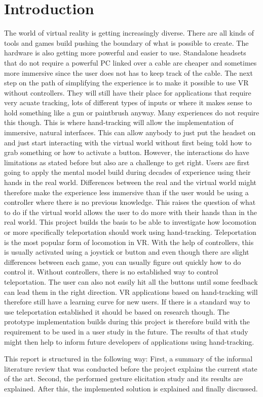
\chapter{Introduction}
The world of virtual reality is getting increasingly diverse. There are all kinds of tools and games build pushing the boundary of what is possible to create. The hardware is also getting more powerful and easier to use. Standalone headsets that do not require a powerful PC linked over a cable are cheaper and sometimes more immersive since the user does not has to keep track of the cable. The next step on the path of simplifying the experience is to make it possible to use VR without controllers. They will still have their place for applications that require very acuate tracking, lots of different types of inputs or where it makes sense to hold something like a gun or paintbrush anyway. Many experiences do not require this though. This is where hand-tracking will allow the implementation of immersive, natural interfaces. This can allow anybody to just put the headset on and just start interacting with the virtual world without first being told how to grab something or how to activate a button. However, the interactions do have limitations as stated before but also are a challenge to get right. Users are first going to apply the mental model build during decades of experience using their hands in the real world. Differences between the real and the virtual world might therefore make the experience less immersive than if the user would be using a controller where there is no previous knowledge. This raises the question of what to do if the virtual world allows the user to do more with their hands than in the real world. This project builds the basis to be able to investigate how locomotion or more specifically teleportation should work using hand-tracking. Teleportation is the most popular form of locomotion in VR. With the help of controllers, this is usually activated using a joystick or button and even though there are slight differences between each game, you can usually figure out quickly how to do control it. Without controllers, there is no established way to control teleportation. The user can also not easily hit all the buttons until some feedback can lead them in the right direction. VR applications based on hand-tracking will therefore still have a learning curve for new users. If there is a standard way to use teleportation established it should be based on research though. The prototype implementation builds during this project is therefore build with the requirement to be used in a user study in the future. The results of that study might then help to inform future developers of applications using hand-tracking.


This report is structured in the following way: First, a summary of the informal literature review that was conducted before the project explains the current state of the art. Second, the performed gesture elicitation study and its results are explained. After this, the implemented solution is explained and finally discussed.





